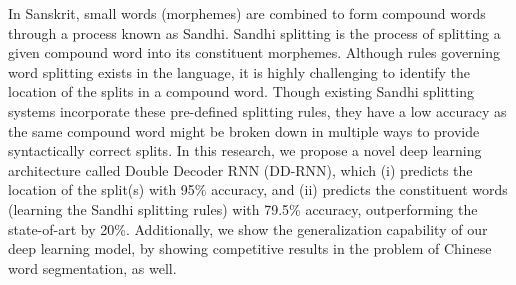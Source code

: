 In Sanskrit, small words (morphemes) are combined to form compound words through a process known as Sandhi. Sandhi splitting is the process of splitting a given compound word into its constituent morphemes. Although rules governing word splitting exists in the language, it is highly challenging to identify the location of the splits in a compound word. Though existing Sandhi splitting systems incorporate these pre-defined splitting rules, they have a low accuracy as the same compound word might be broken down in multiple ways to provide syntactically correct splits. In this research, we propose a novel deep learning architecture called Double Decoder RNN (DD-RNN), which (i) predicts the location of the split(s) with 95\% accuracy, and (ii) predicts the constituent words (learning the Sandhi splitting rules) with 79.5\% accuracy, outperforming the state-of-art by 20\%. Additionally, we show the generalization capability of our deep learning model, by showing competitive results in the problem of Chinese word segmentation, as well.
